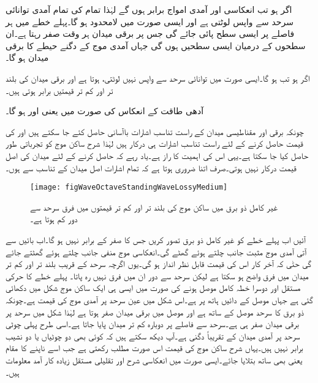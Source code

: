 اگر  ہو تب انعکاسی اور آمدی امواج برابر ہوں گے لہٰذا تمام کی تمام آمدی توانائی سرحد سے واپس لوٹتی ہے اور ایسی صورت میں  لامحدود ہو گا۔پہلے خطے میں ہر  فاصلے پر ایسی سطح  پائی جائے گی جس پر برقی میدان ہر وقت صفر رہتا ہے۔ان سطحوں کے درمیان ایسی سطحیں ہوں گی جہاں آمدی موج کے دگنے حیطے کا برقی میدان ہو گا۔

اگر  ہو تب  ہو گا۔ایسی صورت میں توانائی سرحد سے واپس نہیں لوٹتی،  ہوتا ہے اور برقی میدان کی بلند تر اور کم تر قیمتیں برابر ہوتی ہیں۔

آدھی طاقت کے انعکاس کی صورت میں  یعنی  اور  ہو گا۔ 

چونکہ برقی اور مقناطیسی میدان کے راست تناسب اشارات باآسانی حاصل کئے جا سکتے ہیں اور  کی قیمت حاصل کرنے کے لئے راست تناسب اشارات ہی درکار ہیں لہٰذا شرح ساکن موج کو تجرباتی طور حاصل کیا جا سکتا ہے۔یہی اس کی اہمیت کا راز ہے۔یاد رہے کہ  حاصل کرنے کے لئے میدان کی اصل قیمت درکار نہیں ہوتی۔صرف اتنا ضروری ہوتا ہے کہ تمام اشارات اصل میدان کے تناسب سے ہوں۔

\begin{figure}
\centering
\texttt{[image: figWaveOctaveStandingWaveLossyMedium]}
\caption{غیر کامل ذو برق میں ساکن موج کی بلند تر اور کم تر قیمتوں میں فرق سرحد سے دور کم ہوتا ہے۔}
\label{شکل_موج_غیر_کامل_ذوبرق_ساکن_موج}
\end{figure}

آئیں اب پہلے خطے کو غیر کامل ذو برق تصور کریں جس کا  صفر کے برابر نہیں ہو گا۔اب بائیں سے آتی آمدی موج مثبت  جانب چلتے ہوئے گھٹے گی۔انعکاسی موج منفی  جانب چلتے ہوئے گھٹتے جائے گی حتٰی کہ آخر کار اس کی قیمت قابل نظر انداز ہو گی۔یوں اگرچہ سرحد کے قریب بلند تر اور کم تر میدان میں فرق  واضح ہو سکتا ہے لیکن سرحد سے دور ان میں فرق نہیں رہ پاتا۔ پہلے خطے کا حرکی مستقل  اور دوسرا خطہ کامل موصل ہونے کی صورت میں ایسی ہی ایک ساکن موج شکل  میں دکھائی گئی ہے جہاں موصل  کے دائیں ہاتھ پر ہے۔اس شکل میں عین سرحد پر آمدی
 موج کی قیمت  ہے۔چونکہ ذو برق کا سرحد موصل کے ساتھ ہے اور موصل میں برقی میدان صفر ہوتا ہے لہٰذا شکل میں سرحد پر برقی میدان صفر ہی ہے۔سرحد سے  فاصلے پر دوبارہ کم تر میدان پایا جاتا ہے۔اسی طرح  پہلی چوٹی سرحد پر آمدی میدان کے تقریباً  دگنی ہے۔آپ دیکھ سکتے ہیں کہ کوئی بھی دو چوٹیاں یا دو نشیب برابر نہیں ہیں۔یہاں شرح ساکن موج کی قیمت اس صورت مطلب رکھتی ہے جب اسے ناپنے کا مقام یعنی  بھی ساتھ بتلایا جائے۔ایسی صورت میں انعکاسی شرح اور تقلیلی مستقل زیادہ کار آمد معلومات ہیں۔

